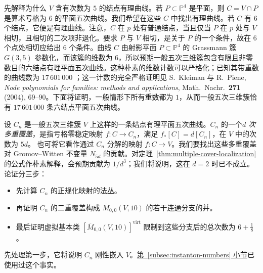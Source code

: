先解释为什么 $V$ 含有次数为 $5$ 的结点有理曲线。若 $P\subset\mathbb P^4$ 是平面，则 $C=V\cap P$ 是算术亏格为 $6$ 的平面五次曲线。我们希望在这些 $C$ 中找出有理曲线。若 $C$ 有 $6$ 个结点，它便是有理曲线。注意，$C$ 在 $p$ 处有普通结点，当且仅当 $P$ 在 $p$ 处与 $V$ 相切，且相切的二次项非退化。要求 $P$ 与 $V$ 相切，是关于 $P$ 的一个条件，故在 $6$ 个点处相切应给出 $6$ 个条件。曲线 $C$ 由射影平面 $P\subset\mathbb P^4$ 的 Grassmann 簇 $G(3,5)$ 参数化，而该簇的维数为 $6$，所以预期一般五次三维簇包含有限且非零数目的六结点有理平面五次曲线。这种朴素的维数计数可以严格化；已知其带重数的曲线数为 $17\,601\,000$ ；这一计数的完全严格证明见 S.~Kleiman 与 R.~Piene, \emph{Node polynomials for families: methods and applications}, Math.\ Nachr.\ \textbf{271} (2004), 69--90。下面将证明，一般情形下所有重数都为 $1$，从而一般五次三维簇恰有 $17\,601\,000$ 条六结点平面五次曲线。

设 $C_n$ 是一般五次三维簇 $V$ 上这样的一条结点有理平面五次曲线。$C_n$ 的一个\emph{$d$ 次多重覆盖}，是指亏格零稳定映射 $f:C\to C_n$，满足 $f_*[C]=d[C_n]$，在 $V$ 中的次数为 $5d$。
也可将它看作通过 $C_n$ 分解的映射 $f:C\to V$。我们要找出这些多重覆盖对 Gromov--Witten 不变量 $N_{5d}$ 的贡献。对定理~\ref{thm:multiple-cover-localization} 的公式作朴素解释，会预期贡献为 $1/d^3$；我们将说明，这在 $d=2$ 时已不成立。论证分三步：
\begin{itemize}
\item 先计算 $C_n$ 的正规化映射的法丛。
\item 再证明 $C_n$ 的二重覆盖构成 $\overline M_{0,0}(V,10)$ 的若干连通分支的并。
\item 最后证明虚拟基本类 $[\overline M_{0,0}(V,10)]^{\mathrm{virt}}$ 限制到这些分支后的总次数为 $6+\frac18$。
\end{itemize}
先处理第一步，它将说明 $C_n$ 刚性嵌入 $V$。\hyperref[subsec:instanton-numbers]{第~\ref*{subsec:instanton-numbers} 小节}已使用过这个事实。

